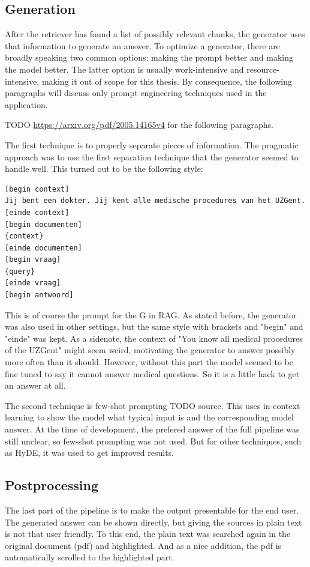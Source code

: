 \subsection{Generation}
After the retriever has found a list of possibly relevant chunks, the generator uses that information to generate an answer. To optimize a generator, there are broadly speaking two common options: making the prompt better and making the model better. The latter option is usually work-intensive and resource-intensive, making it out of scope for this thesis. By consequence, the following paragraphs will discuss only prompt engineering techniques used in the application.

TODO \url{https://arxiv.org/pdf/2005.14165v4} for the following paragraphs.

The first technique is to properly separate pieces of information. The pragmatic approach was to use the first separation technique that the generator seemed to handle well. This turned out to be the following style:
\begin{verbatim}
[begin context]
Jij bent een dokter. Jij kent alle medische procedures van het UZGent.
[einde context]
[begin documenten]
{context}
[einde documenten]
[begin vraag]
{query}
[einde vraag]
[begin antwoord]
\end{verbatim}
This is of course the prompt for the G in RAG. As stated before, the generator was also used in other settings, but the same style with brackets and "begin" and "einde" was kept. As a sidenote, the context of "You know all medical procedures of the UZGent" might seem weird, motivating the generator to answer possibly more often than it should. However, without this part the model seemed to be fine tuned to say it cannot answer medical questions. So it is a little hack to get an answer at all.

The second technique is few-shot prompting TODO source. This uses in-context learning to show the model what typical input is and the corresponding model answer. At the time of development, the prefered answer of the full pipeline was still unclear, so few-shot prompting was not used. But for other techniques, such as HyDE, it was used to get improved results. 

\subsection{Postprocessing}
The last part of the pipeline is to make the output presentable for the end user. The generated answer can be shown directly, but giving the sources in plain text is not that user friendly. To this end, the plain text was searched again in the original document (pdf) and highlighted. And as a nice addition, the pdf is automatically scrolled to the highlighted part.

